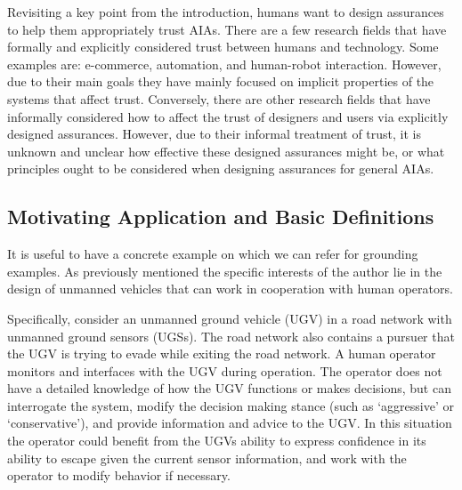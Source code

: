     Revisiting a key point from the introduction, humans want to design assurances to help them appropriately trust AIAs. There are a few research fields that have formally and explicitly considered trust between humans and technology. Some examples are: e-commerce, automation, and human-robot interaction. However, due to their main goals they have mainly focused on implicit properties of the systems that affect trust. Conversely, there are other research fields that have informally considered how to affect the trust of designers and users via explicitly designed assurances. However, due to their informal treatment of trust, it is unknown and unclear how effective these designed assurances might be, or what principles ought to be considered when designing assurances for general AIAs.  

\subsection{Motivating Application and Basic Definitions} \label{sec:mot_example}
    It is useful to have a concrete example on which we can refer for grounding examples. As previously mentioned the specific interests of the author lie in the design of unmanned vehicles that can work in cooperation with human operators.

    Specifically, consider an unmanned ground vehicle (UGV) in a road network with unmanned ground sensors (UGSs). The road network also contains a pursuer that the UGV is trying to evade while exiting the road network. A human operator monitors and interfaces with the UGV during operation. The operator does not have a detailed knowledge of how the UGV functions or makes decisions, but can interrogate the system, modify the decision making stance (such as `aggressive' or `conservative'), and provide information and advice to the UGV. In this situation the operator could benefit from the UGVs ability to express confidence in its ability to escape given the current sensor information, and work with the operator to modify behavior if necessary. 
   
